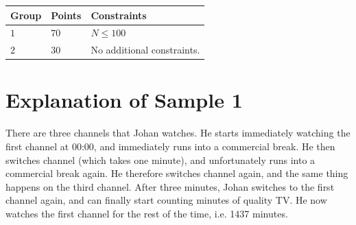 \noindent
\begin{tabular}{| l | l | p{12cm} |}
  \hline
  \textbf{Group} & \textbf{Points} & \textbf{Constraints} \\ \hline
  $1$    & $70$        & $N \leq 100 $ \\ \hline 
  $2$    & $30$        & No additional constraints. \\ \hline 
\end{tabular}

\section*{Explanation of Sample 1}
There are three channels that Johan watches. He starts immediately watching the first channel at 00:00, and immediately runs into a commercial break.
He then switches channel (which takes one minute), and unfortunately runs into a commercial break again.
He therefore switches channel again, and the same thing happens on the third channel.
After three minutes, Johan switches to the first channel again, and can finally start counting minutes of quality TV.
He now watches the first channel for the rest of the time, i.e. 1437 minutes.
